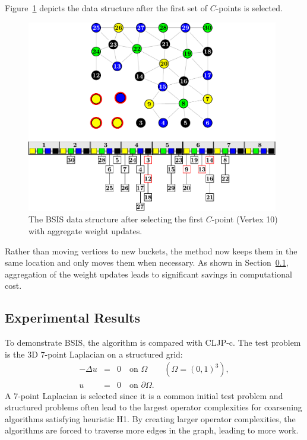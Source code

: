 \documentclass{elsart}
\begin{document}
Figure~\ref{5:fig:cp1-agg} depicts the data structure after the first
set of $C$-points is selected.
\begin{figure}
  \begin{center}
    \includegraphics[width=0.98\textwidth]{images/BSIS/cp1-agg}
    \caption{The BSIS data structure after selecting the first
    $C$-point (Vertex 10) with aggregate weight updates.}
    \label{5:fig:cp1-agg}
  \end{center}
\end{figure}
Rather than moving vertices to new buckets, the method now keeps them
in the same location and only moves them when necessary. As shown in
Section~\ref{5:sec:experiments}, aggregation of the weight updates
leads to significant savings in computational cost.

\subsection{Experimental Results}
\label{5:sec:experiments}
To demonstrate BSIS, the algorithm is compared with CLJP-c. The test
problem is the 3D 7-point Laplacian on a structured grid:
\begin{eqnarray}
\label{5:eqn:Lap} -\Delta u & = & 0 \quad \textrm{on } \Omega \qquad
(\Omega = (0, 1)^3),\\
\nonumber u & = & 0 \quad \textrm{on } \partial \Omega.
\end{eqnarray}
A 7-point Laplacian is selected since it is a common initial test
problem and structured problems often lead to the largest operator
complexities for coarsening algorithms satisfying heuristic H1. By
creating larger operator complexities, the algorithms are forced to
traverse more edges in the graph, leading to more work.
\end{document}

